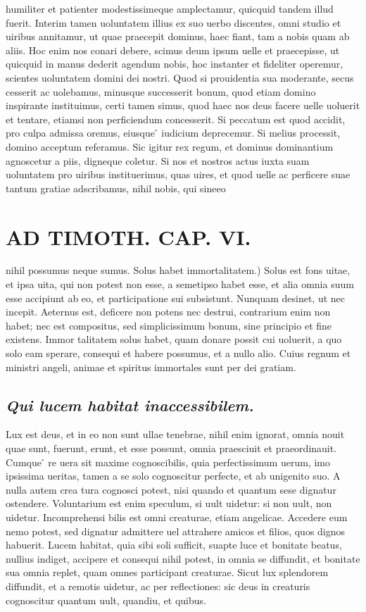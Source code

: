 \documentclass{article}
\begin{document}
\begin{pages}
humiliter et patienter modestissimeque amplectamur, quicquid tandem illud fuerit. Interim tamen uoluntatem illius ex suo uerbo discentes, omni studio et uiribus annitamur, ut quae praecepit dominus, haec fiant, tam a nobis quam ab aliis. Hoc enim nos conari debere, scimus deum ipsum uelle et praecepisse, ut quicquid in manus dederit agendum nobis, hoc instanter et fideliter operemur, scientes uoluntatem domini dei nostri. Quod si prouidentia sua moderante, secus cesserit ac uolebamus, minusque successerit bonum, quod etiam domino inspirante instituimus, certi tamen simus, quod haec nos deus facere uelle uoluerit et tentare, etiamsi non perficiendum concesserit. Si peccatum est quod accidit, pro culpa admissa oremus, eiusque ́ iudicium deprecemur. Si melius processit, domino acceptum referamus. Sic igitur rex regum, et dominus dominantium agnoscetur a piis, digneque coletur. Si nos et nostros actus iuxta suam uoluntatem pro uiribus instituerimus, quas uires, et quod uelle ac perficere suae tantum gratiae adscribamus, nihil nobis, qui sineeo  \pend
\section*{AD TIMOTH. CAP. VI. }
\marginpar{[ p.539 ]}\pstart nihil possumus neque sumus. Solus habet immortalitatem.) Solus est fons uitae, et ipsa uita, qui non potest non esse, a semetipso habet esse, et alia omnia suum esse accipiunt ab eo, et participatione sui subsistunt. Nunquam desinet, ut nec incepit. Aeternus est, deficere non potens nec destrui, contrarium enim non habet; nec est compositus, sed simplicissimum bonum, sine principio et fine existens. Immor talitatem solus habet, quam donare possit cui uoluerit, a quo solo eam sperare, consequi et habere possumus, et a nullo alio. Cuius regnum et ministri angeli, animae et spiritus immortales sunt per dei gratiam.  \pend
{}
{}
\subsection*{\textit{Qui lucem habitat inaccessibilem. }}\pstart Lux est deus, et in eo non sunt ullae tenebrae, nihil enim ignorat, omnia nouit quae sunt, fuerunt, erunt, et esse possunt, omnia praesciuit et praeordinauit. Cumque ́ re uera sit maxime cognoscibilis, quia perfectissimum uerum, imo ipsissima ueritas, tamen a se solo cognoscitur perfecte, et ab unigenito suo. A nulla autem crea tura cognosci potest, nisi quando et quantum sese dignatur ostendere. Voluntarium est enim speculum, si uult uidetur: si non uult, non uidetur. Incomprehensi bilis est omni creaturae, etiam angelicae. Accedere eum nemo potest, sed dignatur admittere uel attrahere amicos et filios, quos dignos habuerit. Lucem habitat, quia sibi soli sufficit, suapte luce et bonitate beatus, nullius indiget, accipere et consequi nihil potest, in omnia se diffundit, et bonitate sua omnia replet, quam omnes participant creaturae. Sicut lux splendorem diffundit, et a remotis uidetur, ac per reflectiones: sic deus in creaturis cognoscitur quantum uult, quandiu, et quibus.  \pend
{}
{}

\end{pages}
\end{document}
